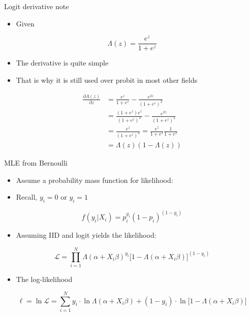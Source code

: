 \documentclass[
  ignorenonframetext,
]{beamer}
\providecommand{\tightlist}{%
  \setlength{\itemsep}{0pt}\setlength{\parskip}{0pt}}
\begin{document}
\begin{frame}{Logit derivative note}
\protect{}\label{logit-derivative-note}
\begin{itemize}
\tightlist
\item
  Given
\end{itemize}

\[
\Lambda(z) = \frac{e^z}{1+e^z} 
\]

\begin{itemize}
\tightlist
\item
  The derivative is quite simple
\item
  That is why it is still used over probit in most other fields
\end{itemize}

\[
\begin{split}
\frac{\partial \Lambda(z)}{\partial z} &= \frac{e^z}{1+e^z} -
\frac{e^{2z}}{(1+e^z)^2} \\
 &= \frac{(1+e^z)e^z}{(1+e^z)^2}- \frac{e^{2z}}{(1+e^z)^2} \\
 &= \frac{e^z}{(1+e^z)^2} = \frac{e^z}{1+e^z}\frac{1}{1+e^z} \\
 &= \Lambda(z)(1-\Lambda(z))
\end{split}
\]
\end{frame}

\begin{frame}{MLE from Bernoulli}
\protect{}\label{mle-from-bernoulli}
\begin{itemize}
\tightlist
\item
  Assume a probability mass function for likelihood:
\item
  Recall, \(y_i = 0\) or \(y_i = 1\)
\end{itemize}

\[
f(y_i|X_i) = p_i^{y_i} (1-p_i)^{(1-y_i)}
\]

\begin{itemize}
\tightlist
\item
  Assuming IID and logit yields the likelihood:
\end{itemize}

\[
\mathcal{L} = \prod_{i=1}^N  \Lambda(\alpha + X_i\beta)^{y_i} \big[1-\Lambda(\alpha + X_i\beta)\big]^{(1-y_i)}
\]

\begin{itemize}
\tightlist
\item
  The log-likelihood
\end{itemize}

\[
\ell = \ln \mathcal{L} = \sum_{i=1}^N y_i \cdot \ln \Lambda(\alpha + X_i\beta) + 
   (1-y_i) \cdot \ln \big[1-\Lambda(\alpha + X_i\beta)\big]
\]
\end{frame}
\end{document}
